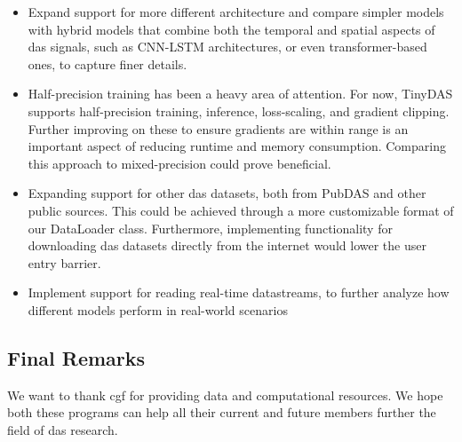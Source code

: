 \begin{itemize}
    \item Expand support for more different architecture and compare simpler models with hybrid models that combine both the temporal and spatial aspects of \acrshort{das} signals, such as CNN-LSTM architectures, or even transformer-based ones, to capture finer details.
    \item  Half-precision training has been a heavy area of attention. For now, TinyDAS supports half-precision training, inference, loss-scaling, and gradient clipping. Further improving on these to ensure gradients are within range is an important aspect of reducing runtime and memory consumption. Comparing this approach to mixed-precision could prove beneficial.
    \item Expanding support for other \acrshort{das} datasets, both from PubDAS and other public sources. This could be achieved through a more customizable format of our DataLoader class. Furthermore, implementing functionality for downloading \acrshort{das} datasets directly from the internet would lower the user entry barrier.
    \item Implement support for reading real-time datastreams, to further analyze how different models perform in real-world scenarios
\end{itemize}

\subsection{Final Remarks}

We want to thank \acrfull{cgf} for providing data and computational resources. We hope both these programs can help all their current and future members further the field of \acrshort{das} research.